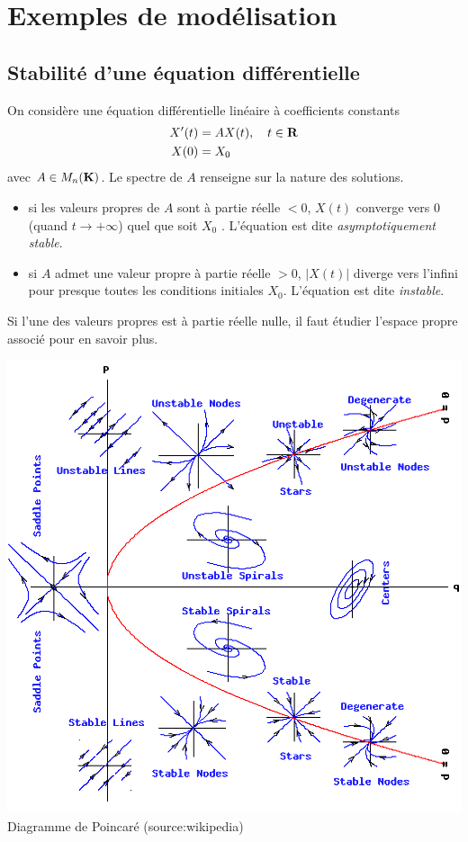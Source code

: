 \section{Exemples de modélisation}

\subsection{Stabilité d'une équation différentielle}
On considère une équation différentielle linéaire à coefficients constants
\begin{align*}
X'(t) & = AX(t), \quad t \in \mathbf{R} \\
X(0) & = X_0
\end{align*}
avec $A \in M_n(\mathbf{K})$. Le spectre de $A$ renseigne sur la nature des solutions.
\begin{itemize}
\item si les valeurs propres de $A$ sont à partie réelle $<0$, $X(t)$ converge vers 0 (quand $t\rightarrow +\infty$) quel que soit $X_0$ . L'équation est dite \emph{asymptotiquement stable}.
\item si $A$ admet une valeur propre à partie réelle $> 0$, $|X(t)|$ diverge vers l'infini pour presque toutes les conditions initiales $X_0$. L'équation est dite \emph{instable}.
\end{itemize}

\begin{remark}
Si l'une des valeurs propres est à partie réelle nulle, il faut étudier
l'espace propre associé pour en savoir plus.
\end{remark}

\begin{center}
	\includegraphics[width=0.4\linewidth]{flows2d.png}\\
	\scriptsize Diagramme de Poincaré (source:wikipedia)
\end{center}

